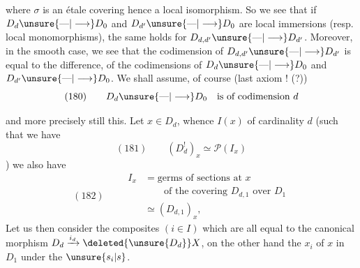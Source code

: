 where $\sigma$ is an étale covering hence a local isomorphism. So we see that if $D_d\unsure{\text{---}|\longrightarrow}D_0$ and $D_{d'}\unsure{\text{---}|\longrightarrow}D_0$ are local immersions (resp. local monomorphisms), the same holds for $D_{d,d'}\unsure{\text{---}|\longrightarrow}D_{d'}$. Moreover, in the smooth case, we see that the codimension of $D_{d,d'}\unsure{\text{---}|\longrightarrow}D_{d'}$ is equal to the difference, of the codimensions of $D_d\unsure{\text{---}|\longrightarrow}D_0$ and $D_{d'}\unsure{\text{---}|\longrightarrow}D_0$. We shall assume, of course (last axiom ! (?))
\[
(180)\qquad D_d\unsure{\text{---}|\longrightarrow}D_0\quad\text{is of codimension }d
\]

 and more precisely still this. Let  $x\in D_d$, whence $I(x)$ of cardinality $d$ (such that we have
\[
(181)\qquad(D_d^!)_x\simeq\mathcal P(I_x)
\]
)
  we also have
\[
(182)\qquad\begin{aligned}
I_x&=\text{germs of sections at }x\\
&\qquad\text{of the covering }D_{d,1}\text{ over }D_1\\
&\simeq(D_{d,1})_x,
\end{aligned}
\]
Let us then consider the composites $(i\in I)$
which are all equal to the canonical morphism $D_d\xrightarrow{i_d}\deleted{\unsure{D_d}}X$, on the other hand the   $x_i$ of $x$ in $D_1$ under the $\unsure{s_i|s}$.
